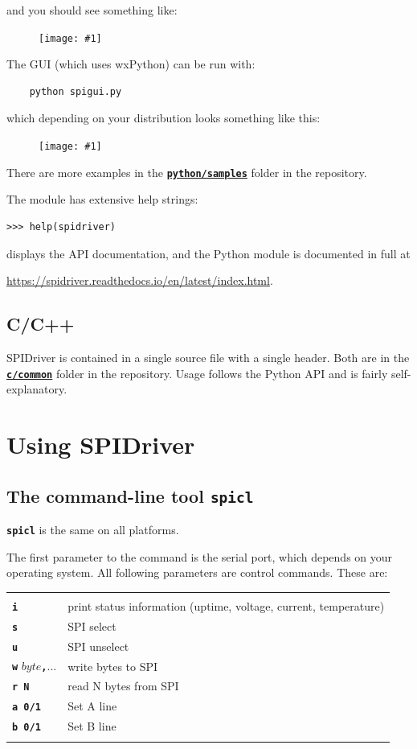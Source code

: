 \documentclass{article}
\newcommand{\png}[1]{
\begin{figure}[H]
\begin{center}
\texttt{[image: \#1]}
\end{center}
\end{figure}
}
\newcommand{\mach}[1]{\texttt{\textbf{#1}}}
\newcommand{\gap}{\vspace{10pt}}
\begin{document}
and you should see something like:

\png{img/spidriver/spidriver-flash}

The GUI (which uses wxPython) can be run with:

\begin{lstlisting}
    python spigui.py
\end{lstlisting}

which depending on your distribution looks something like this:

\png{img/spidriver/spidriver-gui-linux}

There are more examples in the 
\href{https://github.com/jamesbowman/spidriver/tree/master/python/samples}{\mach{python/samples}} folder in the repository.

The module has extensive help strings:
\begin{lstlisting}
>>> help(spidriver)
\end{lstlisting}
displays the API documentation, and
the Python module is documented in full at

\url{https://spidriver.readthedocs.io/en/latest/index.html}.

\newpage
\subsection{C/C++}

SPIDriver is contained in a single source file with a single header.
Both are in the
\href{https://github.com/jamesbowman/spidriver/tree/master/c/common}{\mach{c/common}} folder in the repository.
Usage follows the Python API and is fairly self-explanatory.

\newpage
\section{Using SPIDriver}

\subsection{The command-line tool \mach{spicl}}
\index{spicl@\mach{spicl}}

\mach{spicl} is the same on all platforms.

The first parameter to the command is the serial port, which depends on your operating system.
All following parameters are control commands. These are:

\gap\begin{tabular}{ll}
\hline \\
  \mach{i}     & print status information (uptime, voltage, current, temperature) \\
  \mach{s}     & SPI select \\
  \mach{u}     & SPI unselect \\
  \mach{w} $byte$\mach{,}...     & write bytes to SPI \\
  \mach{r N}   & read N bytes from SPI \\
  \mach{a 0/1} & Set A line \\
  \mach{b 0/1} & Set B line \\
\hline \\
\end{tabular}
\gap
\end{document}
